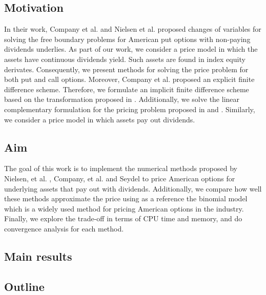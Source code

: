 \subsection{Motivation}

In their work, Company et al. \cite*{company_egorova_jodar_2014} and Nielsen 
et al. \cite*{nielsen_2001} proposed changes of variables for solving the free
boundary problems for American put options with non-paying dividends underlies.
 As part of our work, we consider a price model in which
the assets have continuous dividends yield. Such assets are found in index
equity derivates. Consequently, we present methods for solving the price problem
for both put and call options. Moreover, Company et al. \cite*{company_egorova_jodar_2014} 
proposed an explicit finite difference scheme. Therefore, we formulate an implicit 
finite difference scheme based on the transformation proposed in 
\cite*{company_egorova_jodar_2014}. Additionally, we solve the linear complementary
formulation for the pricing problem proposed in \cite*{seydel_2009} and 
\cite*{wilmott_howison_dewynne_1995}. Similarly, we consider a price model in which
assets pay out dividends.

\subsection{Aim} 

The goal of this work is to implement the numerical methods proposed by 
Nielsen, et al. \cite{nielsen_2001}, Company, et al. \cite{company_egorova_jodar_2014}
and Seydel \cite*{seydel_2009} to price American options for underlying assets 
that pay out with dividends. Additionally, we compare how well these methods approximate 
the price using as a reference the binomial model which is a widely used method 
for pricing American options in the industry. Finally, we explore the 
trade-off in terms of CPU time and memory, and do convergence analysis for each method.
\subsection{Main results}

\subsection{Outline}

